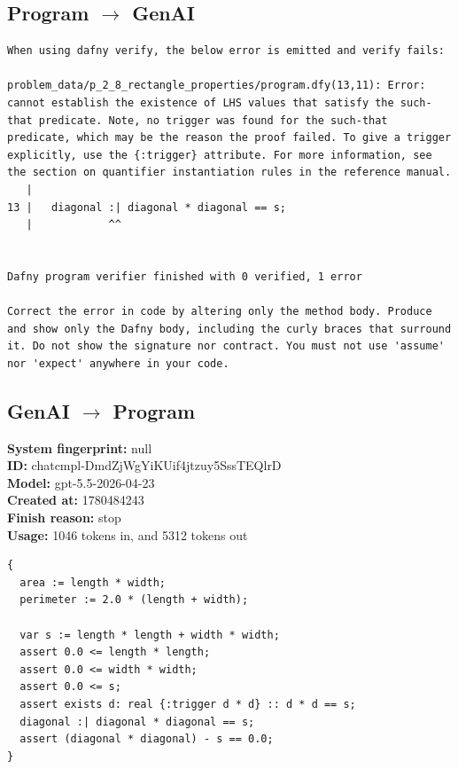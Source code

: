 \documentclass{article}
\begin{document}
\subsection*{Program $\rightarrow$ GenAI}
\begin{lstlisting}
When using dafny verify, the below error is emitted and verify fails:

problem_data/p_2_8_rectangle_properties/program.dfy(13,11): Error: cannot establish the existence of LHS values that satisfy the such-that predicate. Note, no trigger was found for the such-that predicate, which may be the reason the proof failed. To give a trigger explicitly, use the {:trigger} attribute. For more information, see the section on quantifier instantiation rules in the reference manual.
   |
13 |   diagonal :| diagonal * diagonal == s;
   |            ^^


Dafny program verifier finished with 0 verified, 1 error

Correct the error in code by altering only the method body. Produce and show only the Dafny body, including the curly braces that surround it. Do not show the signature nor contract. You must not use 'assume' nor 'expect' anywhere in your code.
\end{lstlisting}
\subsection*{GenAI $\rightarrow$ Program}
\textbf{System fingerprint: }null
\\\textbf{ID: }chatcmpl-DmdZjWgYiKUif4jtzuy5SssTEQlrD
\\\textbf{Model: }gpt-5.5-2026-04-23
\\\textbf{Created at: }1780484243
\\\textbf{Finish reason: }stop
\\\textbf{Usage: }1046 tokens in, and 5312 tokens out
\begin{lstlisting}
{
  area := length * width;
  perimeter := 2.0 * (length + width);

  var s := length * length + width * width;
  assert 0.0 <= length * length;
  assert 0.0 <= width * width;
  assert 0.0 <= s;
  assert exists d: real {:trigger d * d} :: d * d == s;
  diagonal :| diagonal * diagonal == s;
  assert (diagonal * diagonal) - s == 0.0;
}
\end{lstlisting}
\end{document}
